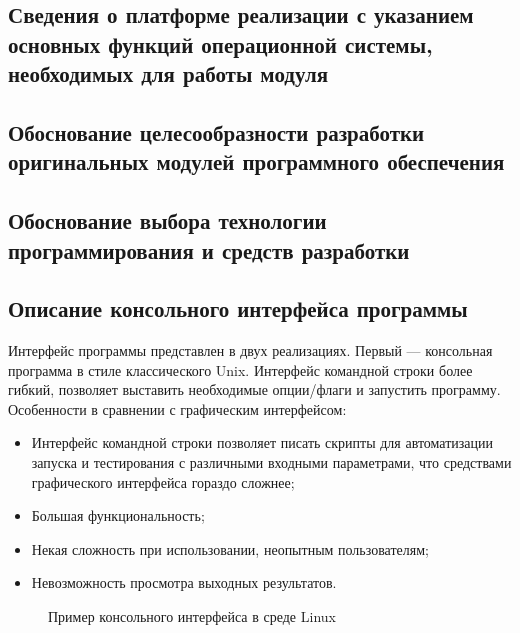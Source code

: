 \subsection{Сведения о платформе реализации с указанием основных функций операционной системы, необходимых для работы модуля}
\subsection{Обоснование целесообразности разработки оригинальных модулей программного обеспечения}
\subsection{Обоснование выбора технологии программирования и средств разработки}
\subsection{Описание консольного интерфейса программы}%
Интерфейс программы представлен в двух реализациях.
Первый — консольная программа в стиле классического Unix. Интерфейс командной строки более гибкий, позволяет выставить необходимые опции/флаги и запустить программу. Особенности в сравнении с графическим интерфейсом:
\begin{itemize}
\item Интерфейс командной строки позволяет писать скрипты для автоматизации запуска и тестирования с различными входными параметрами, что средствами графического интерфейса гораздо сложнее;
\item Большая функциональность;
\item Некая сложность при использовании, неопытным пользователям;
\item Невозможность просмотра выходных результатов.
\end{itemize}

\begin{figure}[ht]
\caption{Пример консольного интерфейса в среде Linux}
\label{pic:con_scr}
\end{figure}

